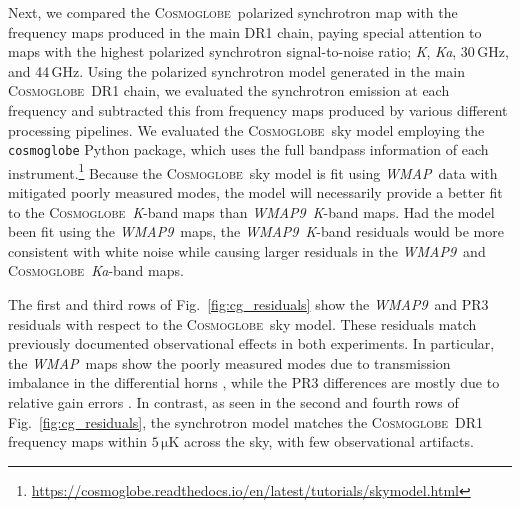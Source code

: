 \documentclass[twocolumn]{../../common/aa}
\def\WMAP{\emph{WMAP}}
\def\WMAPnine{\emph{WMAP9}}
\def\Planck{\emph{Planck}}
\newcommand{\cosmoglobe}{\textsc{Cosmoglobe}}
\newcommand{\K}[0]{\textit K}
\newcommand{\Ka}[0]{\textit{Ka}}
\begin{document}
Next, we compared the \cosmoglobe\ polarized synchrotron map with the frequency maps produced in the main DR1 chain, paying special attention to maps with the highest polarized synchrotron signal-to-noise ratio; \K, \Ka, 30\,GHz, and 44\,GHz.
Using the polarized synchrotron model generated in the main \cosmoglobe\ DR1 chain, we evaluated the synchrotron emission at each frequency and subtracted this from frequency maps produced by various different processing pipelines. We evaluated the \cosmoglobe\ sky model employing the \texttt{cosmoglobe} Python package, which uses the full bandpass information of each instrument.\footnote{\url{https://cosmoglobe.readthedocs.io/en/latest/tutorials/skymodel.html}} 
Because the \cosmoglobe\ sky model is fit using \WMAP\ data with mitigated poorly measured modes, the model will necessarily provide a better fit to the \cosmoglobe\ \K-band maps than \WMAPnine\ \K-band maps. Had the model been fit using the \WMAPnine\ maps, the \WMAPnine\ \K-band residuals would be more consistent with white noise while causing larger residuals in the \WMAPnine\ and \cosmoglobe\ \Ka-band maps.


The first and third rows of Fig.~\ref{fig:cg_residuals} show the \WMAPnine\ and PR3 residuals with respect to the \cosmoglobe\ sky model. These residuals match previously documented observational effects in both experiments. In particular, the \WMAP\ maps show the poorly measured modes due to transmission imbalance in the differential horns \citep{jarosik2007,bennett2012}, while the PR3  differences are mostly  due to relative gain errors \citep{planck2016-l02,planck2020-LVII}.
In contrast, as seen in the second and fourth rows of Fig.~\ref{fig:cg_residuals}, the synchrotron model matches the \cosmoglobe\ DR1 frequency maps within $5\,\mathrm{\mu K}$ across the sky, with few observational artifacts. 
\end{document}
